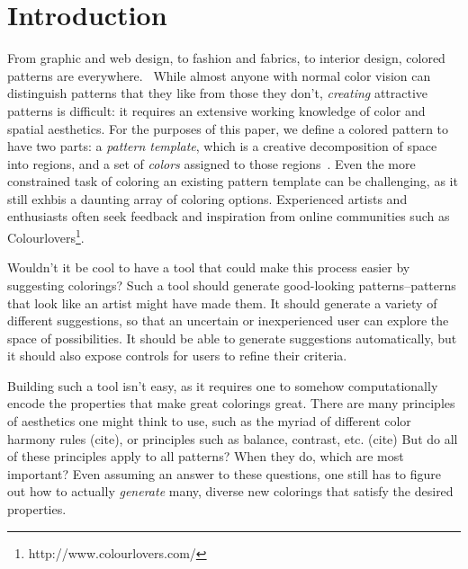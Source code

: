 \section{Introduction}
\label{sec:introduction}

From graphic and web design, to fashion and fabrics, to interior design, colored patterns are everywhere.~ While almost anyone with normal color vision can distinguish patterns that they like from those they don't, \emph{creating} attractive patterns is difficult: it requires an extensive working knowledge of color and spatial aesthetics. For the purposes of this paper, we define a colored pattern to have two parts: a \emph{pattern template}, which is a creative decomposition of space into regions, and a set of \emph{colors} assigned to those regions~. Even the more constrained task of coloring an existing pattern template can be challenging, as it still exhbis a daunting array of coloring options. Experienced artists and enthusiasts often seek feedback and inspiration from online communities such as Colourlovers\footnote{http://www.colourlovers.com/}.

Wouldn't it be cool to have a tool that could make this process easier by suggesting colorings? Such a tool should generate good-looking patterns--patterns that look like an artist might have made them. It should generate a variety of different suggestions, so that an uncertain or inexperienced user can explore the space of possibilities. It should be able to generate suggestions automatically, but it should also expose controls for users to refine their criteria.

Building such a tool isn't easy, as it requires one to somehow computationally encode the properties that make great colorings great. There are many principles of aesthetics one might think to use, such as the myriad of different color harmony rules (cite), or principles such as balance, contrast, etc. (cite) But do all of these principles apply to all patterns? When they do, which are most important? Even assuming an answer to these questions, one still has to figure out how to actually \emph{generate} many, diverse new colorings that satisfy the desired properties.

